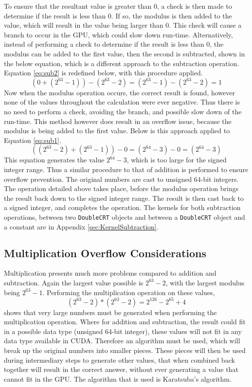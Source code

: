 To ensure that the resultant value is greater than 0, a check is then made to determine if the result is less than 0. If so, the modulus is then added to the value, which will result in the value being larger than 0. This check will cause a branch to occur in the GPU, which could slow down run-time. Alternatively, instead of performing a check to determine if the result is less than 0, the modulus can be added to the first value, then the second is subtracted, shown in the below equation, which is a different approach to the subtraction operation. Equation \ref{eq:sub2} is redefined below, with this procedure applied. 
\begin{equation}
(0 + (2^{63} - 1)) - (2^{63} - 2) = (2^{63} - 1) - (2^{63} - 2) = 1
\end{equation}
Now when the modulus operation occurs, the correct result is found, however none of the values throughout the calculation were ever negative. Thus there is no need to perform a check, avoiding the branch, and possible slow down of the run-time. This method however does result in an overflow issue, because the modulus is being added to the first value. Below is this approach applied to Equation \ref{eq:sub1}.
\begin{equation}
((2^{63} - 2) + (2^{63} - 1)) - 0 = (2^{64} - 3) - 0 = (2^{64} - 3)
\end{equation}
This equation generates the value $2^{64} - 3$, which is too large for the signed integer range. Thus a similar procedure to that of addition is performed to ensure overflow prevention. The original numbers are cast to unsigned 64-bit integers. The operation detailed above takes place, before the modulus operation brings the result back down to the signed integer range. The result is then cast back to a signed integer, and completes the operation. The kernels for both subtraction operations, between two \verb|DoubleCRT| objects and between a \verb|DoubleCRT| object and a constant are in Appendix \ref{sec:KernelSubtraction}.

\subsection{Multiplication Overflow Considerations}
Multiplication presents much more problems compared to addition and subtraction. Again the largest value possible is $2^{63} - 2$, with the largest modulus being $2^{63} - 1$. Performing the multiplication operation on these values, 
\begin{equation} \label{eq:mul}
(2^{63} - 2) * (2^{63} - 2) = 2^{126} - 2^{65} + 4
\end{equation}
shows that very large numbers must be generated when performing the multiplication operation. Where for addition and subtraction, the result could fit in a possible data type (unsigned 64-bit integer), these values will not fit in any data type available in CUDA. Therefore an algorithm must be used, which will break up the original numbers into smaller pieces. These pieces will then be used during intermediary steps to generate other values, that when combined back together will result in the correct answer, without ever generating a value that cannot fit in the GPU. The algorithm that is used is Karatsuba's algorithm. 

